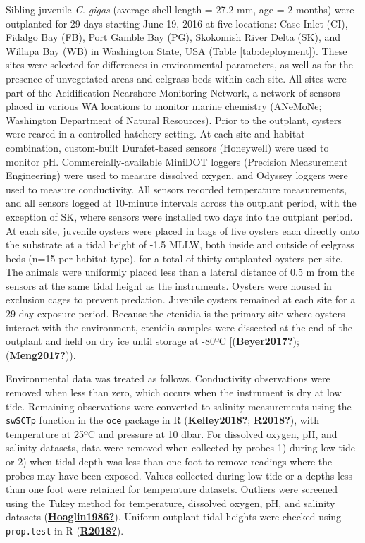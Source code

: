 \documentclass [11pt, proquest] {uwthesis}[2015/03/03]
\begin{document}
Sibling juvenile \emph{C. gigas} (average shell length = 27.2 mm, age = 2 months) were outplanted for 29 days starting June 19, 2016 at five locations: Case Inlet (CI), Fidalgo Bay (FB), Port Gamble Bay (PG), Skokomish River Delta (SK), and Willapa Bay (WB) in Washington State, USA (Table \ref{tab:deployment}). These sites were selected for differences in environmental parameters, as well as for the presence of unvegetated areas and eelgrass beds within each site. All sites were part of the Acidification Nearshore Monitoring Network, a network of sensors placed in various WA locations to monitor marine chemistry (ANeMoNe; Washington Department of Natural Resources). Prior to the outplant, oysters were reared in a controlled hatchery setting. At each site and habitat combination, custom-built Durafet-based sensors (Honeywell) were used to monitor pH. Commercially-available MiniDOT loggers (Precision Measurement Engineering) were used to measure dissolved oxygen, and Odyssey loggers were used to measure conductivity. All sensors recorded temperature measurements, and all sensors logged at 10-minute intervals across the outplant period, with the exception of SK, where sensors were installed two days into the outplant period. At each site, juvenile oysters were placed in bags of five oysters each directly onto the substrate at a tidal height of -1.5 MLLW, both inside and outside of eelgrass beds (n=15 per habitat type), for a total of thirty outplanted oysters per site. The animals were uniformly placed less than a lateral distance of 0.5 m from the sensors at the same tidal height as the instruments. Oysters were housed in exclusion cages to prevent predation. Juvenile oysters remained at each site for a 29-day exposure period. Because the ctenidia is the primary site where oysters interact with the environment, ctenidia samples were dissected at the end of the outplant and held on dry ice until storage at -80ºC {[}(\protect\hyperlink{ref-Beyer2017}{\textbf{Beyer2017?}}); (\protect\hyperlink{ref-Meng2017}{\textbf{Meng2017?}})).

Environmental data was treated as follows. Conductivity observations were removed when less than zero, which occurs when the instrument is dry at low tide. Remaining observations were converted to salinity measurements using the \texttt{swSCTp} function in the \texttt{oce} package in R (\protect\hyperlink{ref-Kelley2018}{\textbf{Kelley2018?}}; \protect\hyperlink{ref-R2018}{\textbf{R2018?}}), with temperature at 25ºC and pressure at 10 dbar. For dissolved oxygen, pH, and salinity datasets, data were removed when collected by probes 1) during low tide or 2) when tidal depth was less than one foot to remove readings where the probes may have been exposed. Values collected during low tide or a depths less than one foot were retained for temperature datasets. Outliers were screened using the Tukey method for temperature, dissolved oxygen, pH, and salinity datasets (\protect\hyperlink{ref-Hoaglin1986}{\textbf{Hoaglin1986?}}). Uniform outplant tidal heights were checked using \texttt{prop.test} in R (\protect\hyperlink{ref-R2018}{\textbf{R2018?}}).
\end{document}
